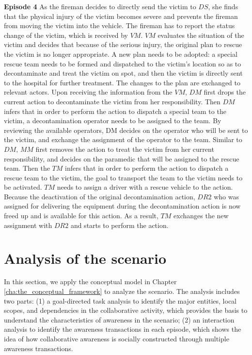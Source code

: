 \begin{scenario}
\footnotesize
\textbf{Episode 4} As the fireman decides to directly send the victim to $DS$, she finds that the physical injury of the victim becomes severe and prevents the fireman from moving the victim into the vehicle. The fireman has to report the status change of the victim, which is received by $VM$. $VM$ evaluates the situation of the victim and decides that because of the serious injury, the original plan to rescue the victim is no longer appropriate. A new plan needs to be adopted: a special rescue team needs to be formed and dispatched to the victim's location so as to decontaminate and treat the victim on spot, and then the victim is directly sent to the hospital for further treatment. The changes to the plan are exchanged to relevant actors. Upon receiving the information from the $VM$, $DM$ first drops the current action to decontaminate the victim from her responsibility. Then $DM$ infers that in order to perform the action to dispatch a special team to the victim, a decontamination operator needs to be assigned to the team. By reviewing the available operators, DM decides on the operator who will be sent to the victim, and exchange the assignment of the operator to the team. Similar to $DM$, $MM$ first removes the action to treat the victim from her current responsibility, and decides on the paramedic that will be assigned to the rescue team. Then the $TM$ infers that in order to perform the action to dispatch a rescue team to the victim, the goal to transport the team to the victim needs to be activated. $TM$ needs to assign a driver with a rescue vehicle to the action. Because the deactivation of the original decontamination action, $DR2$ who was assigned for delivering the equipment during the decontamination action is now freed up and is available for this action. As a result, $TM$ exchanges the new assignment with $DR2$ and starts to perform the action.
\end{scenario}

\section{Analysis of the scenario} %
\label{sec:understanding_the_awareness_phenomena_in_the_scenario}
In this section, we apply the conceptual model in Chapter \ref{cha:the_conceptual_framework} to analyze the scenario. The analysis includes two parts: (1) a goal-directed task analysis to identify the major entities, local scopes, and dependencies in the collaborative activity, which provides the basis to understand the characteristics of awareness in the scenario; (2) an interaction analysis to identify the awareness transactions in each episode, which shows the idea of how collaborative awareness is socially constructed through multiple awareness transactions. 

